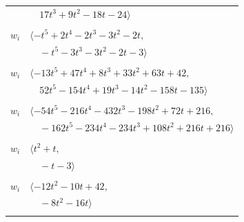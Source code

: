 \documentclass[11pt]{article}
\begin{document}
\begin{longtable}{@{}ll@{}}
 & $\quad 17t^{3}+9t^{2}-18t-24\rangle$\\
\addlinespace[2pt]
\multicolumn{2}{@{}p{0.97\textwidth}@{}}{$i=26$, $D_i=1$, $\rho_{ij}$: $0{:}2, \allowbreak 3{:}1, \allowbreak 11{:}1, \allowbreak 14{:}1, \allowbreak 15{:}1, \allowbreak 16{:}1, \allowbreak 25{:}1, \allowbreak 28{:}1, \allowbreak 32{:}1$}\\
$w_i$ & $\langle -t^{5}+2t^{4}-2t^{3}-3t^{2}-2t,$\\
 & $\quad -t^{5}-3t^{3}-3t^{2}-2t-3\rangle$\\
\addlinespace[2pt]
\multicolumn{2}{@{}p{0.97\textwidth}@{}}{$i=27$, $D_i=1$, $\rho_{ij}$: $1{:}1, \allowbreak 4{:}2, \allowbreak 7{:}2, \allowbreak 8{:}2, \allowbreak 12{:}2, \allowbreak 15{:}1, \allowbreak 18{:}1, \allowbreak 20{:}1, \allowbreak 21{:}1, \allowbreak 24{:}1, \allowbreak 30{:}1, \allowbreak 31{:}2, \allowbreak 32{:}2, \allowbreak 34{:}1, \allowbreak 36{:}2$}\\
$w_i$ & $\langle -13t^{5}+47t^{4}+8t^{3}+33t^{2}+63t+42,$\\
 & $\quad 52t^{5}-154t^{4}+19t^{3}-14t^{2}-158t-135\rangle$\\
\addlinespace[2pt]
\multicolumn{2}{@{}p{0.97\textwidth}@{}}{$i=28$, $D_i=9$, $\rho_{ij}$: $2{:}1, \allowbreak 3{:}1, \allowbreak 12{:}2, \allowbreak 16{:}1, \allowbreak 19{:}2, \allowbreak 20{:}2, \allowbreak 26{:}2, \allowbreak 29{:}2, \allowbreak 30{:}2, \allowbreak 31{:}1$}\\
$w_i$ & $\langle -54t^{5}-216t^{4}-432t^{3}-198t^{2}+72t+216,$\\
 & $\quad -162t^{5}-234t^{4}-234t^{3}+108t^{2}+216t+216\rangle$\\
\addlinespace[2pt]
\multicolumn{2}{@{}p{0.97\textwidth}@{}}{$i=29$, $D_i=1$, $\rho_{ij}$: $7{:}1, \allowbreak 14{:}2, \allowbreak 16{:}2, \allowbreak 28{:}1, \allowbreak 32{:}1, \allowbreak 35{:}1$}\\
$w_i$ & $\langle t^{2}+t,$\\
 & $\quad -t-3\rangle$\\
\addlinespace[2pt]
\multicolumn{2}{@{}p{0.97\textwidth}@{}}{$i=30$, $D_i=1$, $\rho_{ij}$: $9{:}2, \allowbreak 12{:}1, \allowbreak 15{:}2, \allowbreak 18{:}2, \allowbreak 23{:}2, \allowbreak 27{:}2, \allowbreak 28{:}1, \allowbreak 34{:}1$}\\
$w_i$ & $\langle -12t^{2}-10t+42,$\\
 & $\quad -8t^{2}-16t\rangle$\\
\addlinespace[2pt]
\multicolumn{2}{@{}p{0.97\textwidth}@{}}{$i=31$, $D_i=1$, $\rho_{ij}$: $0{:}2, \allowbreak 2{:}1, \allowbreak 5{:}1, \allowbreak 6{:}1, \allowbreak 7{:}2, \allowbreak 15{:}2, \allowbreak 20{:}1, \allowbreak 22{:}2, \allowbreak 24{:}1, \allowbreak 27{:}1, \allowbreak 28{:}2, \allowbreak 32{:}1, \allowbreak 34{:}1$}\\

\end{longtable}
\end{document}
